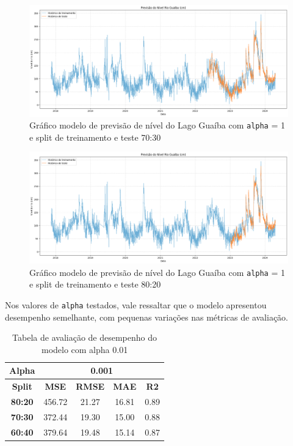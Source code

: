 \begin{figure}[H]
	\caption{\label{fig:comparacao_radiacao_nivel_rio}Gráfico modelo de previsão de nível do Lago Guaíba com \texttt{alpha} = 1 e split de treinamento e teste 70:30}
	\begin{center}
		\includegraphics[scale=0.35]{figuras/modelo_previsao_70_30.png}
	\end{center}
\end{figure}

\begin{figure}[H]
	\caption{\label{fig:comparacao_radiacao_nivel_rio}Gráfico modelo de previsão de nível do Lago Guaíba com \texttt{alpha} = 1 e split de treinamento e teste 80:20}
	\begin{center}
		\includegraphics[scale=0.35]{figuras/modelo_previsao_80_20.png}
	\end{center}
\end{figure}

Nos valores de \texttt{alpha} testados, vale ressaltar que o modelo apresentou desempenho semelhante, com pequenas variações nas métricas de avaliação.

\begin{table}[H]
\centering
\begin{tabular}{|c|c|c|c|c|}
\hline
\textbf{Alpha} & \multicolumn{4}{|c|}{\textbf{0.001}} \\
\hline
\textbf{Split} & \textbf{MSE} & \textbf{RMSE} & \textbf{MAE} & \textbf{R2} \\
\hline
\textbf{80:20} & 456.72 & 21.27 & 16.81 & 0.89 \\
\textbf{70:30} & 372.44 & 19.30 & 15.00 & 0.88 \\
\textbf{60:40} & 379.64 & 19.48 & 15.14 & 0.87 \\
\hline
\end{tabular}
\caption{Tabela de avaliação de desempenho do modelo com alpha 0.01}
\end{table}

